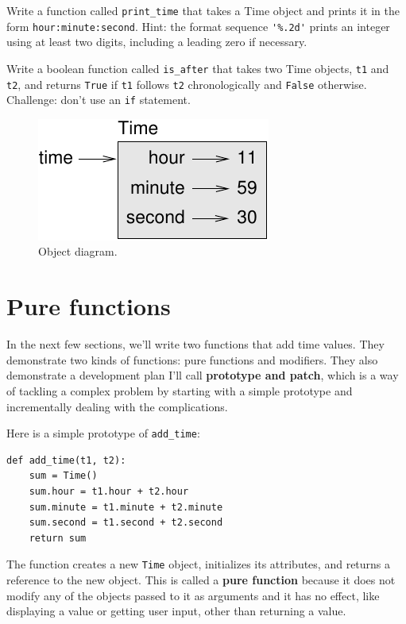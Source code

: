 \documentclass[10pt]{book}
\begin{document}
\begin{CJK}{UTF8}{gbsn}
\begin{exercise}
\label{ex.printtime}

Write a function called \verb"print_time" that takes a 
Time object and prints it in the form {\tt hour:minute:second}.
Hint: the format sequence \verb"'%.2d'" prints an integer using
at least two digits, including a leading zero if necessary.

\end{exercise}

\begin{exercise}
\label{isafter}

Write a boolean function called \verb"is_after" that
takes two Time objects, {\tt t1} and {\tt t2}, and
returns {\tt True} if {\tt t1} follows {\tt t2} chronologically and
{\tt False} otherwise.  Challenge: don't use an {\tt if} statement.
\end{exercise}

\begin{figure}
\centerline
{\includegraphics[scale=0.8]{figs/time.pdf}}
\caption{Object diagram.}
\label{fig.time}
\end{figure}


\section{Pure functions}

In the next few sections, we'll write two functions that add time
values.  They demonstrate two kinds of functions: pure functions and
modifiers.  They also demonstrate a development plan I'll call {\bf
  prototype and patch}, which is a way of tackling a complex problem
by starting with a simple prototype and incrementally dealing with the
complications.

Here is a simple prototype of \verb"add_time":

\begin{verbatim}
def add_time(t1, t2):
    sum = Time()
    sum.hour = t1.hour + t2.hour
    sum.minute = t1.minute + t2.minute
    sum.second = t1.second + t2.second
    return sum
\end{verbatim}
%
The function creates a new {\tt Time} object, initializes its
attributes, and returns a reference to the new object.  This is called
a {\bf pure function} because it does not modify any of the objects
passed to it as arguments and it has no effect,
like displaying a value or getting user input, 
other than returning a value.


\end{CJK}
\end{document}
